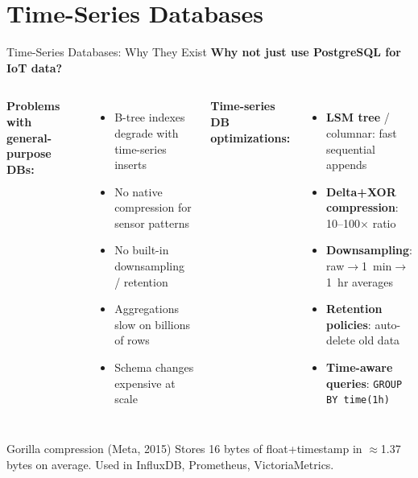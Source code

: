 \documentclass[aspectratio=169,11pt]{beamer}
\begin{document}
\section{Time-Series Databases}

\begin{frame}{Time-Series Databases: Why They Exist}
    \small
    \textbf{Why not just use PostgreSQL for IoT data?}

    \vspace{0.1cm}
    \begin{columns}
        \textbf{Problems with general-purpose DBs:}
        \begin{itemize}\setlength{\itemsep}{0pt}
            \item B-tree indexes degrade with time-series inserts
            \item No native compression for sensor patterns
            \item No built-in downsampling / retention
            \item Aggregations slow on billions of rows
            \item Schema changes expensive at scale
        \end{itemize}

        \textbf{Time-series DB optimizations:}
        \begin{itemize}\setlength{\itemsep}{0pt}
            \item \textbf{LSM tree} / columnar: fast sequential appends
            \item \textbf{Delta+XOR compression}: 10--100$\times$ ratio
            \item \textbf{Downsampling}: raw$\rightarrow$1~min$\rightarrow$1~hr averages
            \item \textbf{Retention policies}: auto-delete old data
            \item \textbf{Time-aware queries}: \texttt{GROUP BY time(1h)}
        \end{itemize}
    \end{columns}

    \vspace{0.1cm}
    \begin{exampleblock}{Gorilla compression (Meta, 2015)}
        Stores 16 bytes of float+timestamp in $\approx$1.37 bytes on average. Used in InfluxDB, Prometheus, VictoriaMetrics.
    \end{exampleblock}
\end{frame}
\end{document}
